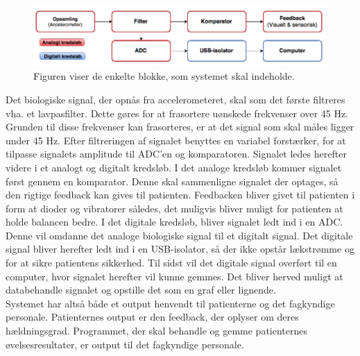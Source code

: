 \begin{figure}[H]
	\centering
	\includegraphics[scale=0.5]{figures/cProblemloesning/Blokdiagram.PNG}
	\caption{Figuren viser de enkelte blokke, som systemet skal indeholde.}
	\label{kravblok}
\end{figure}
Det biologiske signal, der opnås fra accelerometeret, skal som det første filtreres vha. et lavpasfilter. Dette gøres for at frasortere uønskede frekvenser  over 45 Hz. Grunden til disse frekvenser kan frasorteres, er at det signal som skal måles ligger under 45 Hz. Efter filtreringen af signalet benyttes en variabel forstærker, for at tilpasse signalets amplitude til ADC’en og komparatoren. Signalet ledes herefter videre i et analogt og digitalt kredsløb. I det analoge kredsløb kommer signalet først gennem en komparator. Denne skal sammenligne signalet der optages, så den rigtige feedback kan gives til patienten. Feedbacken bliver givet til patienten i form at dioder og vibratorer således, det muligvis bliver muligt for patienten at holde balancen bedre. I det digitale kredsløb, bliver signalet ledt ind i en ADC. Denne vil omdanne det analoge biologiske signal til et digitalt signal. Det digitale signal bliver herefter ledt ind i en USB-isolator, så der ikke opstår lækstrømme og for at sikre patientens sikkerhed. Til sidst vil det digitale signal overført til en computer, hvor signalet herefter vil kunne gemmes. Det bliver herved muligt at databehandle signalet og opstille det som en graf eller lignende. \\
Systemet har altså både et output henvendt til patienterne og det fagkyndige personale. Patienternes output er den feedback, der oplyser om deres hældningsgrad. Programmet, der skal behandle og gemme patienternes øvelsesresultater, er output til det fagkyndige personale. 



